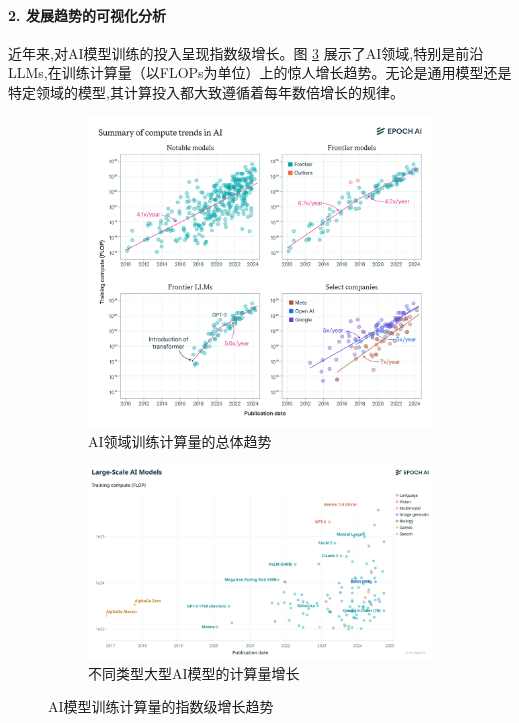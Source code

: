 \paragraph{2. 发展趋势的可视化分析}
近年来,对AI模型训练的投入呈现指数级增长。图 \ref{fig:llm_compute_trends} 展示了AI领域,特别是前沿LLMs,在训练计算量（以FLOPs为单位）上的惊人增长趋势。无论是通用模型还是特定领域的模型,其计算投入都大致遵循着每年数倍增长的规律。
\begin{figure}[H]
    \centering
    \begin{subfigure}[b]{0.48\textwidth}
        \centering
        \includegraphics[width=\textwidth]{figures/LLM1.png}
        \caption{AI领域训练计算量的总体趋势}
        \label{fig:llm_compute_summary}
    \end{subfigure}
    \hfill
    \begin{subfigure}[b]{0.48\textwidth}
        \centering
        \includegraphics[width=\textwidth]{figures/LLM2.png}
        \caption{不同类型大型AI模型的计算量增长}
        \label{fig:llm_compute_by_type}
    \end{subfigure}
    \caption{AI模型训练计算量的指数级增长趋势}
    \label{fig:llm_compute_trends}
\end{figure}

